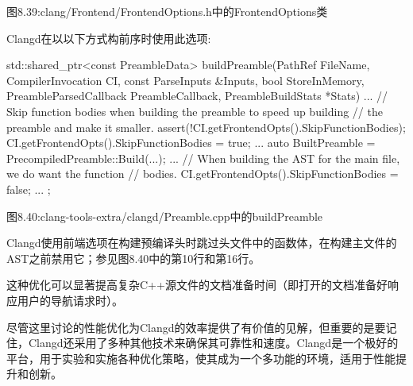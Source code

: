 \begin{center}
图8.39:clang/Frontend/FrontendOptions.h中的FrontendOptions类
\end{center}

Clangd在以以下方式构前序时使用此选项:

\begin{cpp}
std::shared_ptr<const PreambleData>
buildPreamble(PathRef FileName, CompilerInvocation CI,
              const ParseInputs &Inputs, bool StoreInMemory,
              PreambleParsedCallback PreambleCallback,
              PreambleBuildStats *Stats) {
  ...
  // Skip function bodies when building the preamble to speed up building
  // the preamble and make it smaller.
  assert(!CI.getFrontendOpts().SkipFunctionBodies);
  CI.getFrontendOpts().SkipFunctionBodies = true;
  ...
  auto BuiltPreamble = PrecompiledPreamble::Build(...);
  ...
  // When building the AST for the main file, we do want the function
  // bodies.
  CI.getFrontendOpts().SkipFunctionBodies = false;
  ...
};
\end{cpp}

\begin{center}
图8.40:clang-tools-extra/clangd/Preamble.cpp中的buildPreamble
\end{center}

Clangd使用前端选项在构建预编译头时跳过头文件中的函数体，在构建主文件的AST之前禁用它；参见图8.40中的第10行和第16行。

这种优化可以显著提高复杂C++源文件的文档准备时间（即打开的文档准备好响应用户的导航请求时）。

尽管这里讨论的性能优化为Clangd的效率提供了有价值的见解，但重要的是要记住，Clangd还采用了多种其他技术来确保其可靠性和速度。Clangd是一个极好的平台，用于实验和实施各种优化策略，使其成为一个多功能的环境，适用于性能提升和创新。












































